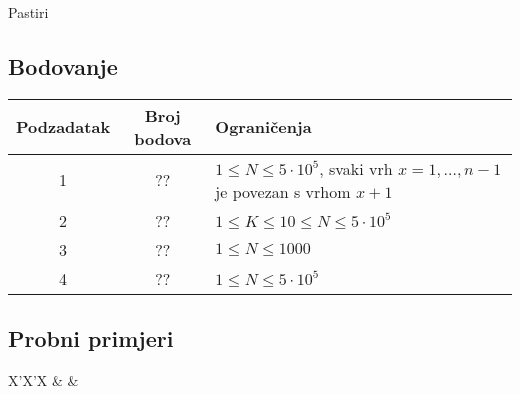 \begin{statement}[
  problempoints=100,
  timelimit=1 sekunda,
  memorylimit=512 MiB,
]{Pastiri}
\subsection*{Bodovanje}
{\renewcommand{\arraystretch}{1.4}
  \setlength{\tabcolsep}{6pt}
  \begin{tabular}{ccl}
 Podzadatak & Broj bodova & Ograničenja \\ \midrule
  1 & ?? & $1 \le N \le 5\cdot10^5$, svaki vrh $x = 1, \dots, n-1$ je povezan s vrhom $x + 1$\\
  2 & ?? & $1 \le K \le 10 \le N \le 5\cdot10^5$ \\
  3 & ?? & $1 \le N \le 1000$ \\
  4 & ?? & $1 \le N \le 5\cdot10^{5}$ \\
\end{tabular}}

\subsection*{Probni primjeri}
\begin{tabularx}{\textwidth}{X'X'X}
 &
 &
\end{tabularx}

\end{statement}

